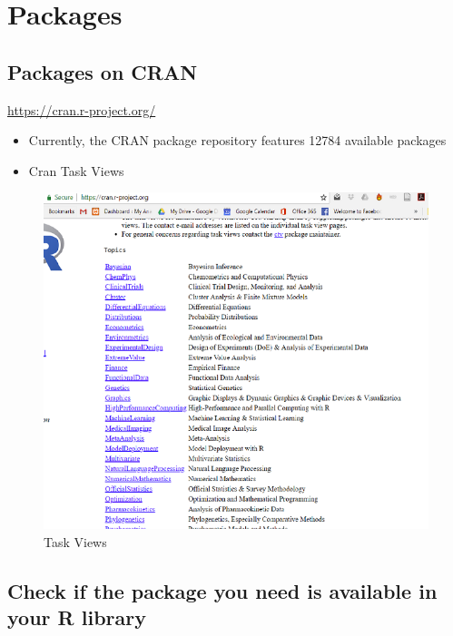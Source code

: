 \documentclass[
]{book}
\providecommand{\tightlist}{%
  \setlength{\itemsep}{0pt}\setlength{\parskip}{0pt}}
\begin{document}
\hypertarget{packages}{%
\section{Packages}\label{packages}}

\hypertarget{packages-on-cran}{%
\subsection{Packages on CRAN}\label{packages-on-cran}}

\url{https://cran.r-project.org/}

\begin{itemize}
\tightlist
\item
  Currently, the CRAN package repository features 12784 available packages
\item
  Cran Task Views
\end{itemize}

\begin{figure}
\centering
\includegraphics{packages.PNG}
\caption{Task Views}
\end{figure}

\hypertarget{check-if-the-package-you-need-is-available-in-your-r-library}{%
\subsection{Check if the package you need is available in your R library}\label{check-if-the-package-you-need-is-available-in-your-r-library}}
\end{document}
